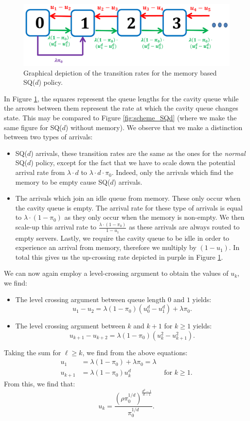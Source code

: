 \documentclass[12pt]{report}
\begin{document}
\begin{figure}[t]
	\centering
	\captionsetup{width=0.8\linewidth}
	\includegraphics[width=0.8\linewidth]{figures/Chapter5/scheme_intuition.PNG}
	\caption{Graphical depiction of the transition rates for the memory based SQ($d$) policy.}
	\label{fig:intuition_memory_scheme}
\end{figure}

In Figure \ref{fig:intuition_memory_scheme}, the squares represent the queue lengths for the cavity queue while the arrows between them represent the rate at which the cavity queue changes state. This may be compared to Figure \ref{fig:scheme_SQd} (where we make the same figure for SQ($d$) without memory). We observe that we make a distinction between two types of arrivals:
\begin{itemize}
	\item SQ($d$) arrivals, these transition rates are the same as the ones for the \textit{normal} SQ($d$) policy, except for the fact that we have to scale down the potential arrival rate from $\lambda \cdot d$ to $\lambda \cdot d \cdot \pi_0$. Indeed, only the arrivals which find the memory to be empty cause SQ($d$) arrivals.
	\item The arrivals which join an idle queue from memory. These only occur when the cavity queue is empty. The arrival rate for these type of arrivals is equal to $\lambda \cdot (1-\pi_0)$ as they only occur when the memory is non-empty. We then scale-up this arrival rate to $\frac{\lambda \cdot (1-\pi_0)}{1-u_1}$ as these arrivals are always routed to empty servers. Lastly, we require the cavity queue to be idle in order to experience an arrival from memory, therefore we multiply by $(1-u_1)$. In total this gives us the up-crossing rate depicted in purple in Figure \ref{fig:intuition_memory_scheme}.
\end{itemize}
We can now again employ a level-crossing argument to obtain the values of $u_k$, we find:
\begin{itemize}
	\item The level crossing argument between queue length $0$ and $1$ yields:
	$$
	u_1 - u_2 = \lambda (1-\pi_0) (u_0^d - u_1^d) + \lambda \pi_0.
	$$
	\item The level crossing argument between $k$ and $k+1$ for $k \geq 1$ yields:
	$$
	u_{k+1} - u_{k+2} = \lambda (1-\pi_0) (u_k^2 - u_{k+1}^2).
	$$
\end{itemize}
Taking the sum for $\ell \geq k$, we find from the above equations:
\begin{align*}
	u_1 &= \lambda (1-\pi_0) + \lambda \pi_0 = \lambda &\\
	u_{k+1} &= \lambda (1-\pi_0) u_k^d & \mbox{ for } k \geq 1.
\end{align*}
From this, we find that:
$$
u_k = \frac{(\rho \pi_0^{1/d})^{\frac{d^k-1}{d-1}}}{\pi_0^{1/d}}.
$$
\end{document}
